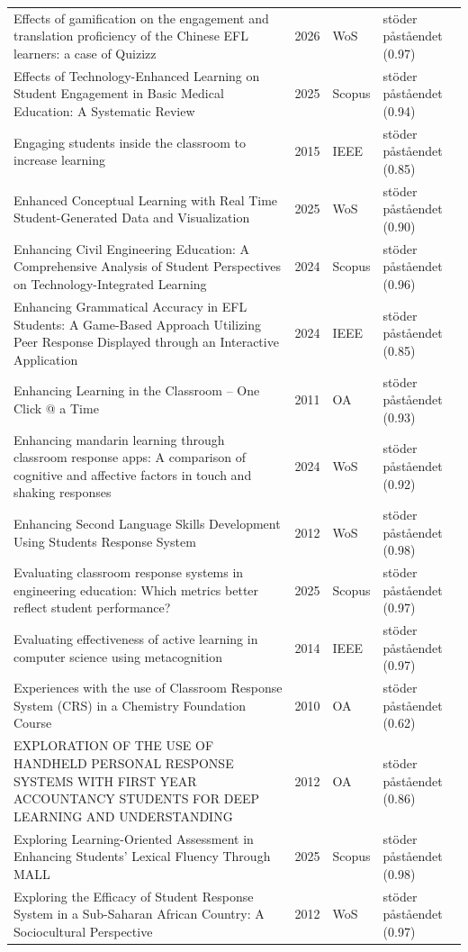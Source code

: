 \begin{longtable}{@{}%
  >{\raggedright\arraybackslash}p{}c%
  >{\raggedright\arraybackslash}p{}%
  >{\raggedright\arraybackslash}p{}@{}}
Effects of gamification on the engagement and translation proficiency of the Chinese EFL learners: a case of Quizizz & 2026 & WoS & stöder påståendet (0.97) \\
Effects of Technology-Enhanced Learning on Student Engagement in Basic Medical Education: A Systematic Review & 2025 & Scopus & stöder påståendet (0.94) \\
Engaging students inside the classroom to increase learning & 2015 & IEEE & stöder påståendet (0.85) \\
Enhanced Conceptual Learning with Real Time Student-Generated Data and Visualization & 2025 & WoS & stöder påståendet (0.90) \\
Enhancing Civil Engineering Education: A Comprehensive Analysis of Student Perspectives on Technology-Integrated Learning & 2024 & Scopus & stöder påståendet (0.96) \\
Enhancing Grammatical Accuracy in EFL Students: A Game-Based Approach Utilizing Peer Response Displayed through an Interactive Application & 2024 & IEEE & stöder påståendet (0.85) \\
Enhancing Learning in the Classroom -- One Click @ a Time & 2011 & OA & stöder påståendet (0.93) \\
Enhancing mandarin learning through classroom response apps: A comparison of cognitive and affective factors in touch and shaking responses & 2024 & WoS & stöder påståendet (0.92) \\
Enhancing Second Language Skills Development Using Students Response System & 2012 & WoS & stöder påståendet (0.98) \\
Evaluating classroom response systems in engineering education: Which metrics better reflect student performance? & 2025 & Scopus & stöder påståendet (0.97) \\
Evaluating effectiveness of active learning in computer science using metacognition & 2014 & IEEE & stöder påståendet (0.97) \\
Experiences with the use of Classroom Response System (CRS) in a Chemistry Foundation Course & 2010 & OA & stöder påståendet (0.62) \\
EXPLORATION OF THE USE OF HANDHELD PERSONAL RESPONSE SYSTEMS WITH FIRST YEAR ACCOUNTANCY STUDENTS FOR DEEP LEARNING AND UNDERSTANDING & 2012 & OA & stöder påståendet (0.86) \\
Exploring Learning-Oriented Assessment in Enhancing Students' Lexical Fluency Through MALL & 2025 & Scopus & stöder påståendet (0.98) \\
Exploring the Efficacy of Student Response System in a Sub-Saharan African Country: A Sociocultural Perspective & 2012 & WoS & stöder påståendet (0.97) \\

\end{longtable}
